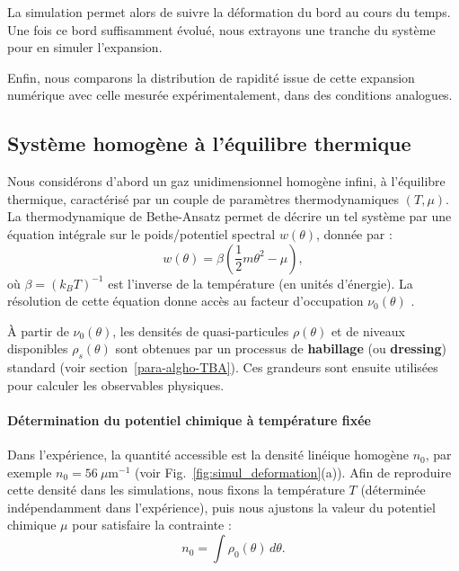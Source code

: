 La simulation permet alors de suivre la déformation du bord au cours du temps. Une fois ce bord suffisamment évolué, nous extrayons une tranche du système pour en simuler l’expansion.

Enfin, nous comparons la distribution de rapidité issue de cette expansion numérique avec celle mesurée expérimentalement, dans des conditions analogues.


\subsection{Système homogène à l'équilibre thermique}

Nous considérons d’abord un gaz unidimensionnel homogène infini, à l’équilibre thermique, caractérisé par un couple de paramètres thermodynamiques $(T, \mu)$. La thermodynamique de Bethe-Ansatz permet de décrire un tel système par une équation intégrale sur le poids/potentiel spectral $w(\theta)$, donnée par :
\begin{equation}
w(\theta) = \beta\left(\frac{1}{2}m\theta^2 - \mu\right),
\end{equation}
où $\beta = (k_B T)^{-1}$ est l’inverse de la température (en unités d’énergie). La résolution de cette équation donne accès au facteur d’occupation $\nu_0(\theta)$ .

À partir de $\nu_0(\theta)$, les densités de quasi-particules $\rho(\theta)$ et de niveaux disponibles $\rho_s(\theta)$ sont obtenues par un processus de {\bf habillage} (ou {\bf dressing}) standard (voir section~\ref{para-algho-TBA}). Ces grandeurs sont ensuite utilisées pour calculer les observables physiques.



\paragraph{Détermination du potentiel chimique à température fixée}

Dans l’expérience, la quantité accessible est la densité linéique homogène $n_0$, par exemple $n_0 = 56~\mu\mathrm{m}^{-1}$ (voir Fig.~\ref{fig:simul_deformation}(a)). Afin de reproduire cette densité dans les simulations, nous fixons la température $T$ (déterminée indépendamment dans l’expérience), puis nous ajustons la valeur du potentiel chimique $\mu$ pour satisfaire la contrainte :
\begin{equation}
n_0 = \int \rho_0(\theta)\, d\theta.
\end{equation}

